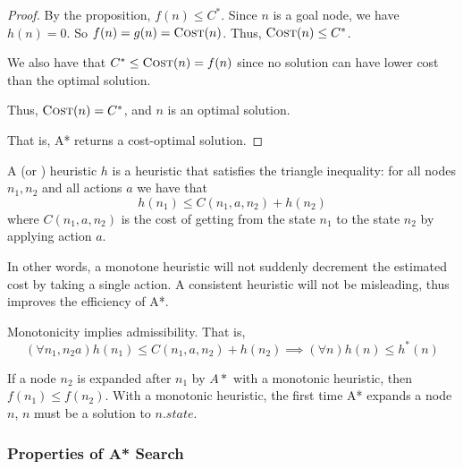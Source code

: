 \begin{listu}
\begin{proof}
        By the proposition, $f(n) \le C^*$. Since $n$ is a goal node, we have $h(n) = 0$. So $f(n) = g(n) = \textsc{Cost}(n)$. Thus, $\textsc{Cost}(n) \le C^*$.

        We also have that $C^* \le \textsc{Cost}(n) = f(n)$ since no solution can have lower cost than the optimal solution.

        Thus, $\textsc{Cost}(n) = C^*$, and $n$ is an optimal solution.

        That is, A* returns a cost-optimal solution. 
    \end{proof}

    \begin{definition}\label{def:monotonicity}
        A  (or ) heuristic $h$ is a heuristic that satisfies the triangle inequality: for all nodes $n_1, n_2$ and all actions $a$ we have that \[
            h(n_1) \le C(n_1, a, n_2) + h(n_2)
        \] where $C(n_1, a, n_2)$ is the cost of getting from the state $n_1$ to the state $n_2$ by applying action $a$.
    \end{definition}

    In other words, a monotone heuristic will not suddenly decrement the estimated cost by taking a single action. A consistent heuristic will not be misleading, thus improves the efficiency of A*.

    \begin{theorem}
        Monotonicity implies admissibility. That is, \[
            (\forall n_1, n_2 a) h(n_1) \le C(n_1, a, n_2) + h(n_2) \implies (\forall n) h(n) \le h^*(n)
        \]
    \end{theorem}

    If a node $n_2$ is expanded after $n_1$ by $A*$ with a monotonic heuristic, then $f(n_1) \le f(n_2)$. With a monotonic heuristic, the first time A* expands a node $n$, $n$ must be a  solution to $n.state$. 
\end{listu}

\subsubsection{Properties of A* Search}


